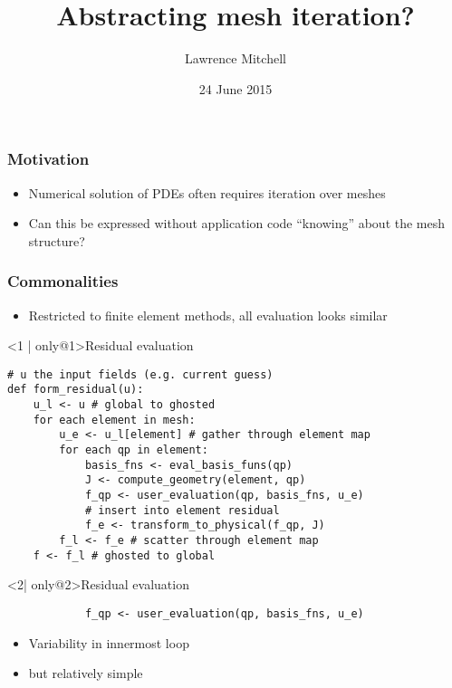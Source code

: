 \documentclass[presentation]{beamer}
\institute{Departments of Computing and Mathematics, Imperial College London}
\author{Lawrence Mitchell}
\date{24 June 2015}
\title{Abstracting mesh iteration?}
\begin{document}
\maketitle


\begin{frame}
  \frametitle{Motivation}
  \begin{itemize}
\item Numerical solution of PDEs often requires iteration over
    meshes
  \item Can this be expressed without application code ``knowing'' about
    the mesh structure?
  \end{itemize}
\end{frame}

\begin{frame}[fragile]
  \frametitle{Commonalities}
  \begin{itemize}
  \item Restricted to finite element methods, all evaluation
    looks similar
  \end{itemize}
\begin{block}<1 | only@1>{Residual evaluation}
\begin{verbatim}
# u the input fields (e.g. current guess)
def form_residual(u):
    u_l <- u # global to ghosted
    for each element in mesh:
        u_e <- u_l[element] # gather through element map
        for each qp in element:
            basis_fns <- eval_basis_funs(qp)
            J <- compute_geometry(element, qp)
            f_qp <- user_evaluation(qp, basis_fns, u_e)
            # insert into element residual
            f_e <- transform_to_physical(f_qp, J)
        f_l <- f_e # scatter through element map
    f <- f_l # ghosted to global
\end{verbatim}
\end{block}
\begin{block}<2| only@2>{Residual evaluation}
\begin{verbatim}
            f_qp <- user_evaluation(qp, basis_fns, u_e)
\end{verbatim}
\end{block}
\begin{itemize}[<2 | only@2>]
\item Variability in innermost loop
\item but relatively simple
\end{itemize}
\end{frame}
\end{document}
